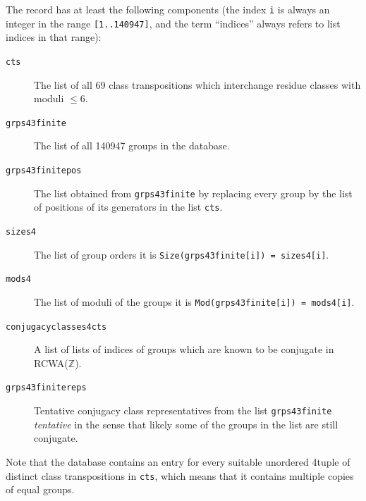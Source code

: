 \documentclass[a4paper,11pt]{report}
\begin{document}
{{{ The record has at least the following components (the index \texttt{i} is always an integer in the range \texttt{[1..140947]}, and the term ``indices'' always refers to list indices in that range): 
\begin{description}
\item[{\texttt{cts}}]  The list of all 69 class transpositions which interchange residue classes with
moduli $\leq 6$. 
\item[{\texttt{grps4{\textunderscore}3finite}}]  The list of all 140947 groups in the database. 
\item[{\texttt{grps4{\textunderscore}3finitepos}}]  The list obtained from \texttt{grps4{\textunderscore}3finite} by replacing every group by the list of positions of its generators in the
list \texttt{cts}. 
\item[{\texttt{sizes4}}]  The list of group orders \texttt{}\texttt{} it is \texttt{Size(grps4{\textunderscore}3finite[i]) = sizes4[i]}. 
\item[{\texttt{mods4}}]  The list of moduli of the groups \texttt{}\texttt{} it
is \texttt{Mod(grps4{\textunderscore}3finite[i]) = mods4[i]}. 
\item[{\texttt{conjugacyclasses4cts}}]  A list of lists of indices of groups which are known to be conjugate in
RCWA({\ensuremath{\mathbb Z}}). 
\item[{\texttt{grps4{\textunderscore}3finite{\textunderscore}reps}}]  Tentative conjugacy class representatives from the list \texttt{grps4{\textunderscore}3finite} \texttt{}\texttt{} \emph{tentative} in the sense that likely some of the groups in the list are still conjugate. 
\end{description}
 Note that the database contains an entry for every suitable unordered
4\texttt{}tuple of distinct class transpositions in \texttt{cts}, which means that it contains multiple copies of equal groups. 
\begin{Verbatim}[commandchars=!@|,fontsize=\small,frame=single,label=Example]
  

\end{Verbatim}}}}
\end{document}
